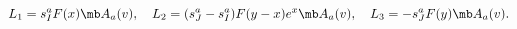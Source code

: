 \begin{equation}
L_{1}=s^{a}_{I}F(x){\mb A}_{a}(v), \quad
L_{2}=(s^{a}_{J}-s^{a}_{I})F(y-x)e^{x}{\mb A}_{a}(v), \quad
L_{3}=-s^{a}_{J}F(y){\mb A}_{a}(v).
\label{BBLOCK}
\end{equation}

